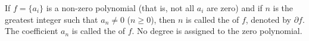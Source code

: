 If $f = \{a_i\}$ is a non-zero polynomial (that is, not all $a_i$ are zero) and if $n$ is the greatest integer such that $a_n \neq 0$ ($n \geq 0$), then $n$ is called the  of $f$, denoted by $\partial f$. The coefficient $a_n$ is called the  of $f$. No degree is assigned to the zero polynomial.
